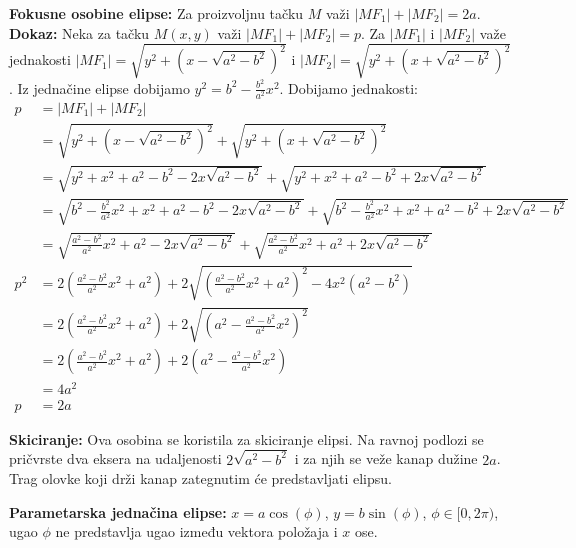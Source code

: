 \documentclass[12pt]{article}
\begin{document}
\textbf{Fokusne osobine elipse:} Za proizvoljnu tačku $M$ važi
$|MF_1|+|MF_2|=2a$.\\
\textbf{Dokaz:} Neka za tačku $M(x,y)$ važi $|MF_1|+|MF_2|=p$. Za $|MF_1|$
i $|MF_2|$ važe jednakosti $|MF_1|=\sqrt{y^2+(x-\sqrt{a^2-b^2})^2}$ i
$|MF_2|=\sqrt{y^2+(x+\sqrt{a^2-b^2})^2}$. Iz jednačine elipse dobijamo
$y^2=b^2-\frac{b^2}{a^2}x^2$. Dobijamo jednakosti:
\begin{align*}
    p   & =|MF_1|+|MF_2|                                                                                                         \\
        & =\sqrt{y^2+(x-\sqrt{a^2-b^2})^2}+\sqrt{y^2+(x+\sqrt{a^2-b^2})^2}                                                       \\
        & =\sqrt{y^2+x^2+a^2-b^2-2x\sqrt{a^2-b^2}}+\sqrt{y^2+x^2+a^2-b^2+2x\sqrt{a^2-b^2}}                                       \\
        & =\sqrt{b^2-\frac{b^2}{a^2}x^2+x^2+a^2-b^2-2x\sqrt{a^2-b^2}}+\sqrt{b^2-\frac{b^2}{a^2}x^2+x^2+a^2-b^2+2x\sqrt{a^2-b^2}} \\
        & =\sqrt{\frac{a^2-b^2}{a^2}x^2+a^2-2x\sqrt{a^2-b^2}}+\sqrt{\frac{a^2-b^2}{a^2}x^2+a^2+2x\sqrt{a^2-b^2}}                 \\
    p^2 & =2(\frac{a^2-b^2}{a^2}x^2+a^2)+2\sqrt{(\frac{a^2-b^2}{a^2}x^2+a^2)^2-4x^2(a^2-b^2)}                                    \\
        & =2(\frac{a^2-b^2}{a^2}x^2+a^2)+2\sqrt{(a^2-\frac{a^2-b^2}{a^2}x^2)^2}                                                  \\
        & =2(\frac{a^2-b^2}{a^2}x^2+a^2)+2(a^2-\frac{a^2-b^2}{a^2}x^2)                                                           \\
        & =4a^2                                                                                                                  \\
    p   & =2a
\end{align*}
\par

\textbf{Skiciranje:} Ova osobina se koristila za skiciranje elipsi. Na ravnoj
podlozi se pričvrste dva eksera na udaljenosti $2\sqrt{a^2-b^2}$ i za
njih se veže kanap dužine $2a$. Trag olovke koji drži kanap zategnutim će
predstavljati elipsu.
\par

\textbf{Parametarska jednačina elipse:} $x=a\cos(\phi)$, $y=b\sin(\phi)$,
$\phi\in[0,2\pi)$, ugao $\phi$ ne predstavlja ugao između vektora položaja
i $x$ ose.
\end{document}
